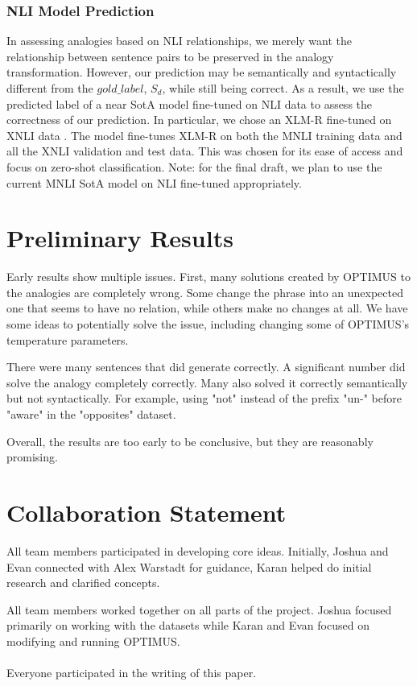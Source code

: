 \documentclass[11pt]{article}
\begin{document}
\subsubsection{NLI Model Prediction}
In assessing analogies based on NLI relationships, we merely want the relationship between sentence pairs to be preserved in the analogy transformation. However, our prediction may be semantically and syntactically different from the $gold\_label$, $S_d$, while still being correct. As a result, we use the predicted label of a near SotA \cite{conneau20unsupervised} model fine-tuned on NLI data to assess the correctness of our prediction. In particular, we chose an XLM-R fine-tuned on XNLI data \cite{conneau18xnli}. The model fine-tunes XLM-R on both the MNLI training data and all the XNLI validation and test data. This was chosen for its ease of access and focus on zero-shot classification. Note: for the final draft, we plan to use the current MNLI SotA model \cite{raffel20t2ttransformer} on NLI fine-tuned appropriately.

\section{Preliminary Results}

Early results show multiple issues. First, many solutions created by OPTIMUS to the analogies are completely wrong. Some change the phrase into an unexpected one that seems to have no relation, while others make no changes at all. We have some ideas to potentially solve the issue, including changing some of OPTIMUS's temperature parameters. 

There were many sentences that did generate correctly. A significant number did solve the analogy completely correctly. Many also solved it correctly semantically but not syntactically. For example, using "not" instead of the prefix "un-" before "aware" in the "opposites" dataset.

Overall, the results are too early to be conclusive, but they are reasonably promising. 

\section{Collaboration Statement}

All team members participated in developing core ideas. Initially, Joshua and Evan connected with Alex Warstadt for guidance, Karan helped do initial research and clarified concepts. 

All team members worked together on all parts of the project. Joshua focused primarily on working with the datasets while Karan and Evan focused on modifying and running OPTIMUS.
\\\\ 
Everyone participated in the writing of this paper.
\end{document}
